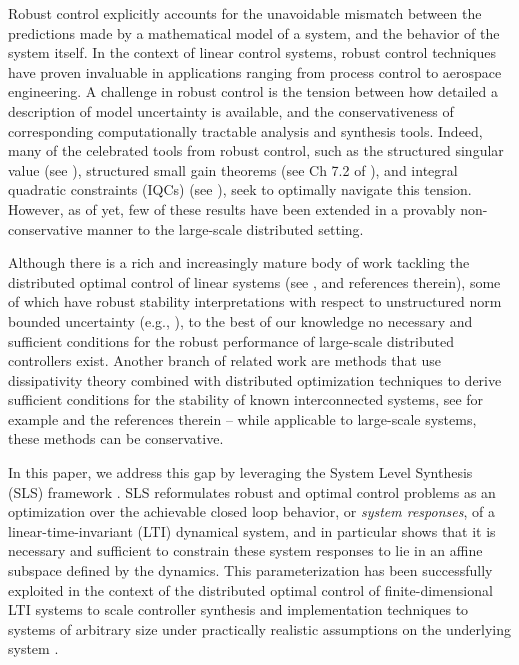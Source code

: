 Robust control explicitly accounts for the unavoidable mismatch between the predictions made by a mathematical model of a system, and the behavior of the system itself.  In the context of linear control systems, robust control techniques \cite{khammash1990stability,dahleh1994control,zhou1996robust} have proven invaluable in applications ranging from process control to aerospace engineering.  A challenge in robust control is the tension between how detailed a description of model uncertainty is available, and the conservativeness of corresponding computationally tractable analysis and synthesis tools.  Indeed, many of the celebrated tools from robust control, such as the structured singular value (see \cite{packard1993complex}), structured small gain theorems (see Ch 7.2 of \cite{dahleh1994control}), and integral quadratic constraints (IQCs) (see \cite{megretski1997system}), seek to optimally navigate this tension.  However, as of yet, few of these results have been extended in a provably non-conservative manner to the large-scale distributed setting.

Although there is a rich and increasingly mature body of work tackling the distributed optimal control of linear systems (see \cite{2006_Rotkowitz_QI_TAC, 2012_Mahajan_Info_survey, wang2019system,zheng2019equivalence}, and references therein), some of which have robust stability interpretations with respect to unstructured norm bounded uncertainty (e.g., \cite{langbort2004distributed,matni2014distributed,lessard2014state,rosinger2017structured,ahmadi2018distributed}), to the best of our knowledge no necessary and sufficient conditions for the robust performance of large-scale distributed controllers exist.  Another branch of related work are methods that use dissipativity theory combined with distributed optimization techniques to derive sufficient conditions for the stability of known interconnected systems, see for example \cite{arcak2016networks,meissen2015compositional,anderson2011dynamical} and the references therein -- while applicable to large-scale systems, these methods can be conservative.

In this paper, we address this gap by leveraging the System Level Synthesis (SLS)  framework \cite{anderson2019system,wang2019system}.  SLS reformulates robust and optimal control problems as an optimization over the achievable closed loop behavior, or \emph{system responses}, of a linear-time-invariant (LTI) dynamical system, and in particular shows that it is necessary and sufficient to constrain these system responses to lie in an affine subspace defined by the dynamics.  This parameterization has been successfully exploited in the context of the distributed optimal control of finite-dimensional LTI systems to scale controller synthesis and implementation techniques to systems of arbitrary size under practically realistic assumptions on the underlying system \cite{wang2014localized, wang2016localized,wang2018separable}.  

